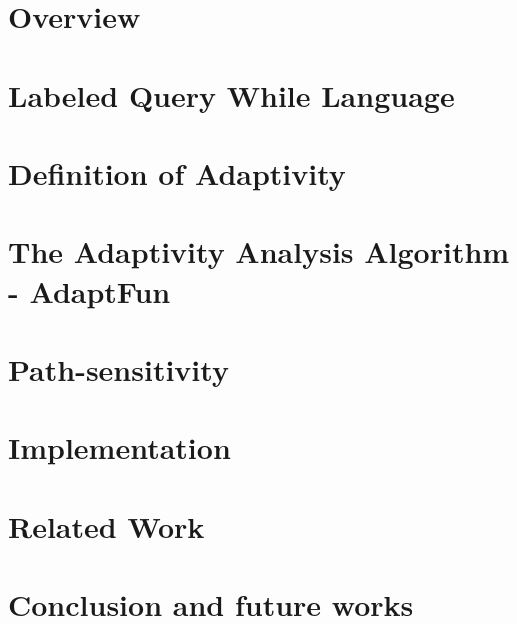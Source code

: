 \documentclass[acmsmall]{acmart}
\newcommand{\THESYSTEM}{\textsf{AdaptFun}}
\begin{document}
\section{Overview}
\label{sec:overview}

\section{Labeled Query  While  Language}
\label{sec:loop_language}
{}
\section{Definition of Adaptivity}
\label{sec:adaptivity}

\section{The Adaptivity Analysis Algorithm - {\THESYSTEM}}
\label{sec:algorithm}
{}
\section{Path-sensitivity}
\label{sec:examples}

\section{Implementation}
\label{sec:implementation}


\section{Related Work}

\section{Conclusion and future works}


\end{document}
